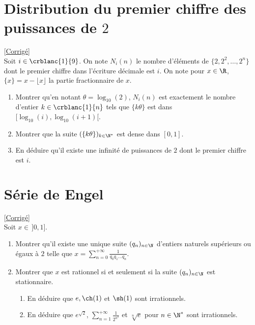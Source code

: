 \documentclass{book}
\begin{document}
\section{Distribution du premier chiffre des puissances de $2$ }
\textcolor{blue}{\hyperref[sec:distribution-du-premier-chiffre-des-puissances-de-2]{[Corrigé]}}\\
\label{Distribution du premier chiffre des puissances de 2}
Soit $i\in \crblanc{1}{9}$. On note $N_i(n)$ le nombre d'éléments de $\{2,2^2,\dots,2^n\}$ dont le premier chiffre dans l'écriture décimale est $i$. On note pour $x\in \R$, $\{x\}=x-\lfloor x\rfloor$ la partie fractionnaire de $x$.
\begin{enumerate}
	\item Montrer qu'en notant $\theta=\log_{10}(2)$, $N_i(n)$ est exactement le nombre d'entier $k\in \crblanc{1}{n}$ tels que $\{k\theta\}$ est dans $[\log_{10}(i),\log_{10}(i+1)[$.
	\item Montrer que la suite $(\{k\theta\})_{k\in \N^*}$ est dense dans $[0,1]$.
	\item En déduire qu'il existe une infinité de puissances de $2$ dont le premier chiffre est $i$.
\end{enumerate}

\section{Série de Engel}
\textcolor{blue}{\hyperref[sec:serie-de-engel]{[Corrigé]}}\\
\label{Série de Engel}
Soit $x\in\, ]0,1]$.
\begin{enumerate}
	\item Montrer qu'il existe une unique suite $(q_n)_{n\in \N}$ d'entiers naturels supérieurs ou égaux à $2$ telle que $x=\displaystyle\sum_{n=0}^{+\infty}\frac{1}{q_0q_1\dots q_n}$.
	\item Montrer que $x$ est rationnel si et seulement si la suite $(q_n)_{n\in \N}$ est stationnaire.
	\begin{enumerate}[label=\alph*.]
		\item En déduire que $e,\ch(1)$ et $\sh(1)$ sont irrationnels.
		\item En déduire que $e^{\sqrt 2}$, $\displaystyle\sum_{n=1}^{+\infty}\frac{1}{2^{n^2}}$ et $\sqrt[n]e$ pour $n\in \N^*$ sont irrationnels.
	\end{enumerate}
\end{enumerate}
\end{document}
